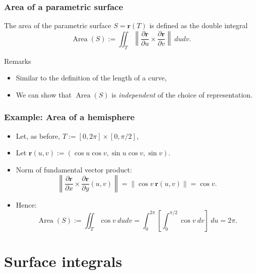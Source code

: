 \documentclass[aspectratio=169]{beamer}
\newcommand{\norm}[1]{\left\|#1\right\|} %
\newcommand{\rr}{\mathbf{r}}
\newcommand{\cover}[1]{{#1}}
\begin{document}
\begin{frame}
    \frametitle{Area of a parametric surface}

    \begin{definition}
        The area of the parametric surface \(S = \rr(T)\) is defined as the double integral
        \[
            \operatorname{Area}(S):= \iint_{T} \norm{\frac{\partial \rr}{\partial u} \times \frac{\partial \rr}{\partial v}} \ dudv.
        \]
    \end{definition}


    \begin{block}{Remarks}
        \begin{itemize}
            \item Similar to the definition of the length of a curve,
            \item We can show that \(\operatorname{Area}(S)\) is \emph{independent} of the choice of representation.
        \end{itemize}
    \end{block}

\end{frame}

\begin{frame}
    \frametitle{Example: Area of a hemisphere}

    \begin{itemize}
        \item     Let, as before, \( T:= [0,2\pi]\times [0,\pi/2]\),
        \item Let    \(\rr(u,v):= (\cos u \cos v, \sin u \cos v, \sin v)\).
        \item    Norm of fundamental vector product:
              \[
                  \norm{\frac{\partial \rr}{\partial x} \times \frac{\partial \rr}{\partial y}(u,v)}
                  = \norm{\cos v \ \rr(u,v)} = \cover{\cos v}.
              \]
        \item
              Hence:     \[
                  \operatorname{Area}(S):= \iint_{T} \cos v \ dudv
                  = \int_{0}^{2\pi} \left[\int_{0}^{\pi/2} \cover{\cos v} \ dv \right] \ du = \cover{2\pi}.
              \]
    \end{itemize}

\end{frame}

\section{Surface integrals}
\end{document}

